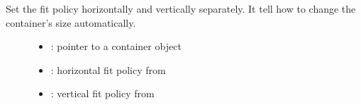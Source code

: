 \documentclass[letterpaper,10pt,english]{sphinxmanual}
\begin{document}
\begin{fulllineitems}
\label{\detokenize{object-types/cont:_CPPv416lv_cont_set_fit2P8lv_obj_t8lv_fit_t8lv_fit_t}}%
\pysigstartmultiline
{}\label{\detokenize{object-types/cont:lv__cont_8h_1a32221e5c6eef681baae6e523ab012451}}%
\pysigstopmultiline
Set the fit policy horizontally and vertically separately. It tell how to change the container’s size automatically. \begin{description}
\item[{}] \leavevmode\begin{itemize}
\item {} 
: pointer to a container object 

\item {} 
: horizontal fit policy from  

\item {} 
: vertical fit policy from  

\end{itemize}

\end{description}


\end{fulllineitems}

\end{document}

